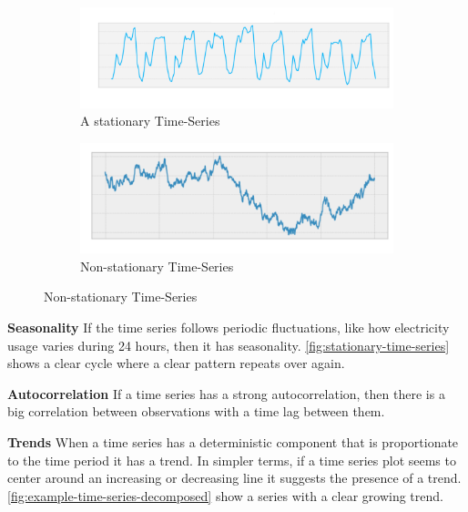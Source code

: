 \begin{figure}[h!]
    \centering
    \caption{Examples of stationarity}
    \label{fig:time-series-examples-stationary-and-non-stationary}
    \begin{subfigure}[b]{0.4\textwidth}
        \includegraphics[width=\textwidth]{./figs/illustrations/time-series_example_stationary.png}
        \hfill
        \caption{A stationary Time-Series}
        \label{fig:stationary-time-series}
    \end{subfigure}
    \begin{subfigure}[b]{0.4\textwidth}
        \includegraphics[width=\textwidth]{./figs/illustrations/time-series_example_non-stationary.png}
        \hfill
        \caption{Non-stationary Time-Series}
        \label{fig:non-stationary-time-series}
    \end{subfigure}
\end{figure}

\textbf{Seasonality}
If the time series follows periodic fluctuations, like how electricity usage varies during 24 hours,
then it has seasonality. \autoref{fig:stationary-time-series} shows a clear cycle where
a clear pattern repeats over again.

\textbf{Autocorrelation}
If a time series has a strong autocorrelation, then there is a big
correlation between observations with a time lag between them.

\textbf{Trends}
When a time series has a deterministic component that is proportionate to the time period it has a trend.
In simpler terms, if a time series plot seems to center around an increasing or decreasing line it suggests the presence of a trend.
\autoref{fig:example-time-series-decomposed} show a series with a clear growing trend.

